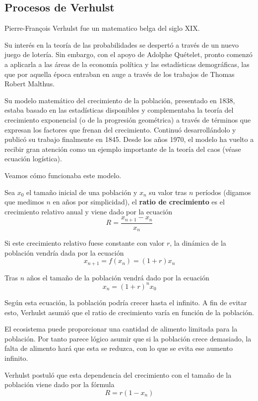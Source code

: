 \subsection{Procesos de Verhulst}
\begin{definition}
Pierre-François Verhulst fue un matematico belga del siglo XIX.

Su interés en la teoría de las probabilidades se despertó a través de un nuevo juego de lotería. Sin embargo, con el apoyo de Adolphe Quételet, pronto comenzó a aplicarla a las áreas de la economía política y las estadísticas demográficas, las que por aquella época entraban en auge a través de los trabajos de Thomas Robert Malthus.

Su modelo matemático del crecimiento de la población, presentado en 1838, estaba basado en las estadísticas disponibles y complementaba la teoría del crecimiento exponencial (o de la progresión geométrica) a través de términos que expresan los factores que frenan del crecimiento. Continuó desarrollándolo y publicó su trabajo finalmente en 1845. Desde los años 1970, el modelo ha vuelto a recibir gran atención como un ejemplo importante de la teoría del caos (véase ecuación logística).
\end{definition}

Veamos cómo funcionaba este modelo.

Sea $x_0$ el tamaño inicial de una población y $x_n$ su valor tras $n$ períodos (digamos que medimos $n$ en años por simplicidad), el \textbf{ratio de crecimiento} es el crecimiento relativo anual y viene dado por la ecuación
\[R=\frac{x_{n+1}-x_n}{x_n} \]

Si este crecimiento relativo fuese constante con valor $r$, la dinámica de la población vendría dada por la ecuación
\[x_{n+1} = f(x_n) = (1+r)x_n\]

Tras $n$ años el tamaño de la población vendrá dado por la ecuación
\[x_n = (1+r)^nx_0\]

Según esta ecuación, la población podría crecer hasta el infinito. A fin de evitar esto, Verhulst asumió que el ratio de crecimiento varía en función de la población.

El ecosistema puede proporcionar una cantidad de alimento limitada para la población. Por tanto parece lógico asumir que si la población crece demasiado, la falta de alimento hará que esta se reduzca, con lo que se evita ese aumento infinito.

Verhulst postuló que esta dependencia del crecimiento con el tamaño de la población viene dado por la fórmula
\[R=r(1-x_n)\]

